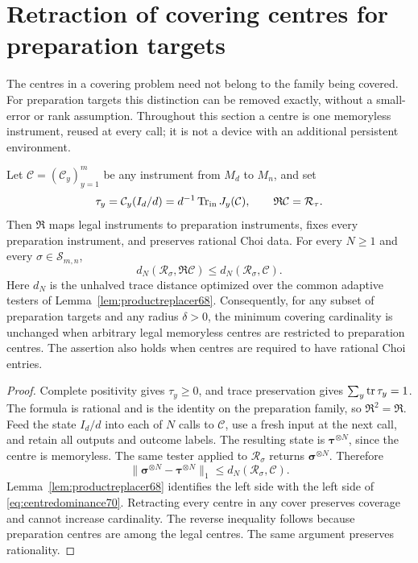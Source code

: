 \section{Retraction of covering centres for preparation targets}\label{sec:centres70}
The centres in a covering problem need not belong to the family being
covered. For preparation targets this distinction can be removed exactly,
without a small-error or rank assumption. Throughout this section a centre
is one memoryless instrument, reused at every call; it is not a device with
an additional persistent environment.

\begin{theorem}\label{thm:retraction70}
Let $\mathcal C=(\mathcal C_y)_{y=1}^m$ be any instrument from $M_d$ to
$M_n$, and set
\begin{equation}\label{eq:retraction70}
 \tau_y=\mathcal C_y(I_d/d)=d^{-1}\operatorname{Tr}_{\rm in}J_y(\mathcal C),
 \qquad \mathfrak R\mathcal C=\mathcal R_\tau.
\end{equation}
Then $\mathfrak R$ maps legal instruments to preparation instruments,
fixes every preparation instrument, and preserves rational Choi data.
For every $N\ge1$ and every $\sigma\in\mathcal S_{m,n}$,
\begin{equation}\label{eq:centredominance70}
 d_N(\mathcal R_\sigma,\mathfrak R\mathcal C)
                  \le d_N(\mathcal R_\sigma,\mathcal C).
\end{equation}
Here $d_N$ is the unhalved trace distance optimized over the common
adaptive testers of Lemma~\ref{lem:productreplacer68}. Consequently, for
any subset of preparation targets and any radius $\delta>0$, the minimum
covering cardinality is unchanged when arbitrary legal memoryless centres
are restricted to preparation centres. The assertion also holds when
centres are required to have rational Choi entries.
\end{theorem}
\begin{proof}
Complete positivity gives $\tau_y\ge0$, and trace preservation gives
$\sum_y\operatorname{tr}\tau_y=1$. The formula is rational and is the identity on the
preparation family, so $\mathfrak R^2=\mathfrak R$. Feed the state $I_d/d$
into each of $N$ calls to $\mathcal C$, use a fresh input at the next call,
and retain all outputs and outcome labels. The resulting state is
$\boldsymbol\tau^{\otimes N}$, since the centre is memoryless. The same
tester applied to $\mathcal R_\sigma$ returns
$\boldsymbol\sigma^{\otimes N}$. Therefore
\[
 \|\boldsymbol\sigma^{\otimes N}-\boldsymbol\tau^{\otimes N}\|_1
                        \le d_N(\mathcal R_\sigma,\mathcal C).
\]
Lemma~\ref{lem:productreplacer68} identifies the left side with the left
side of \eqref{eq:centredominance70}. Retracting every centre in any cover
preserves coverage and cannot increase cardinality. The reverse inequality
follows because preparation centres are among the legal centres. The same
argument preserves rationality.
\end{proof}

